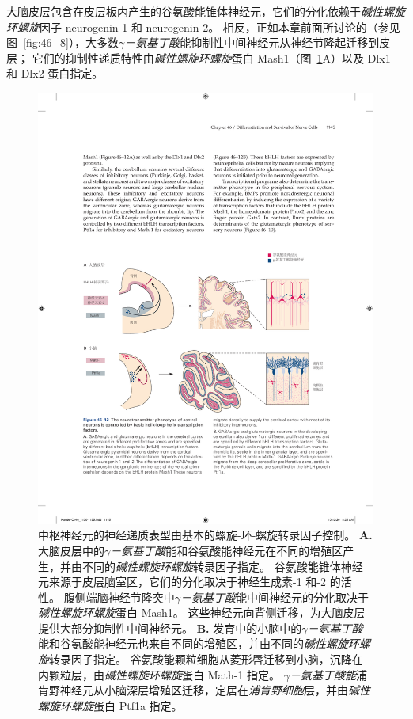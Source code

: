 大脑皮层包含在皮层板内产生的谷氨酸能锥体神经元，它们的分化依赖于\textit{碱性螺旋环螺旋}因子 neurogenin-1 和 neurogenin-2。
相反，正如本章前面所讨论的（参见图~\ref{fig:46_8}），大多数\textit{$\gamma$－氨基丁酸}能抑制性中间神经元从神经节隆起迁移到皮层；
它们的抑制性递质特性由\textit{碱性螺旋环螺旋}蛋白 Mash1（图~\ref{fig:46_12}A）以及 Dlx1 和 Dlx2 蛋白指定。


\begin{figure}[htbp]
	\centering
	\includegraphics[width=1.0\linewidth]{chap46/fig_46_12}
	\caption{中枢神经元的神经递质表型由基本的螺旋-环-螺旋转录因子控制。
		\textbf{A.} 大脑皮层中的\textit{$\gamma$－氨基丁酸}能和谷氨酸能神经元在不同的增殖区产生，并由不同的\textit{碱性螺旋环螺旋}转录因子指定。
		谷氨酸能锥体神经元来源于皮层脑室区，它们的分化取决于神经生成素-1 和-2 的活性。
		腹侧端脑神经节隆突中\textit{$\gamma$－氨基丁酸}能中间神经元的分化取决于\textit{碱性螺旋环螺旋}蛋白 Mash1。
		这些神经元向背侧迁移，为大脑皮层提供大部分抑制性中间神经元。
		\textbf{B.} 发育中的小脑中的\textit{$\gamma$－氨基丁酸}能和谷氨酸能神经元也来自不同的增殖区，并由不同的\textit{碱性螺旋环螺旋}转录因子指定。
		谷氨酸能颗粒细胞从菱形唇迁移到小脑，沉降在内颗粒层，由\textit{碱性螺旋环螺旋}蛋白 Math-1 指定。
		\textit{$\gamma$－氨基丁酸能}浦肯野神经元从小脑深层增殖区迁移，定居在\textit{浦肯野细胞}层，并由\textit{碱性螺旋环螺旋}蛋白 Ptf1a 指定。}
	\label{fig:46_12}
\end{figure}


